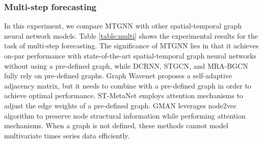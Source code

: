\documentclass[sigconf]{acmart}
\begin{document}
\subsubsection{Multi-step forecasting}
In this experiment, we compare MTGNN with other spatial-temporal graph neural network models. Table \ref{table:multi} shows the experimental results for the task of multi-step forecasting. The significance of MTGNN lies in that it achieves on-par performance with state-of-the-art spatial-temporal graph neural networks without using a pre-defined graph, while DCRNN, STGCN, and MRA-BGCN fully rely on pre-defined graphs. Graph Wavenet proposes a self-adaptive adjacency matrix, but it needs to combine with a pre-defined graph in order to achieve optimal performance. ST-MetaNet employs attention mechanisms to adjust the edge weights of a pre-defined graph. GMAN leverages node2vec algorithm to preserve node structural information while performing attention mechanisms.  When a graph is not defined, these methods cannot model multivariate times series data efficiently. 
\end{document}
